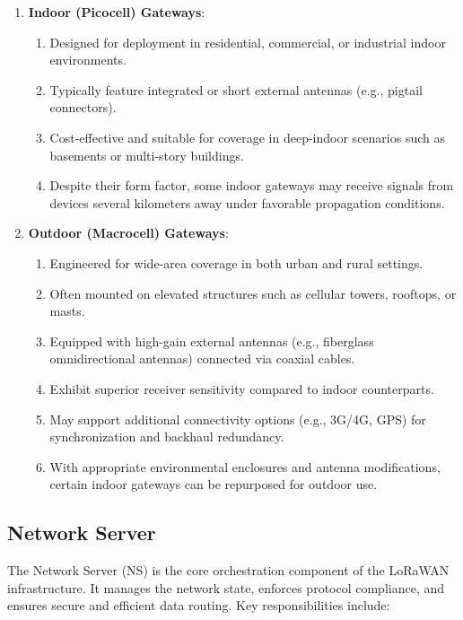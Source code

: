 \begin{enumerate}
    \item \textbf{Indoor (Picocell) Gateways}:
          \begin{enumerate}
              \item Designed for deployment in residential, commercial, or industrial indoor environments.
              \item Typically feature integrated or short external antennas (e.g., pigtail connectors).
              \item Cost-effective and suitable for coverage in deep-indoor scenarios such as basements or multi-story buildings.
              \item Despite their form factor, some indoor gateways may receive signals from devices several kilometers away under favorable propagation conditions.
          \end{enumerate}

    \item \textbf{Outdoor (Macrocell) Gateways}:
          \begin{enumerate}
              \item Engineered for wide-area coverage in both urban and rural settings.
              \item Often mounted on elevated structures such as cellular towers, rooftops, or masts.
              \item Equipped with high-gain external antennas (e.g., fiberglass omnidirectional antennas) connected via coaxial cables.
              \item Exhibit superior receiver sensitivity compared to indoor counterparts.
              \item May support additional connectivity options (e.g., 3G/4G, GPS) for synchronization and backhaul redundancy.
              \item With appropriate environmental enclosures and antenna modifications, certain indoor gateways can be repurposed for outdoor use.
          \end{enumerate}
\end{enumerate}

\subsection{Network Server}

The Network Server (NS) is the core orchestration component of the LoRaWAN infrastructure. It manages the network state, enforces protocol compliance, and ensures secure and efficient data routing. Key responsibilities include:

